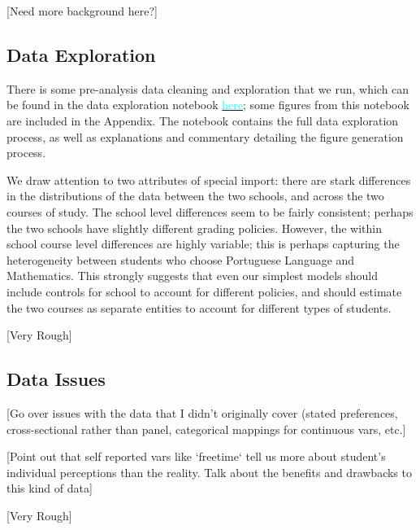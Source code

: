 \documentclass[12pt]{article}
\begin{document}
\textcolor{BrickRed}{[Need more background here?]}

\subsection{Data Exploration}
There is some pre-analysis data cleaning and exploration that we run, which can be found in the data exploration notebook \href{https://github.com/nadavtadelis/Reproducible_Metrics/blob/master/data_exploration.ipynb}{\textcolor{cyan}{here}}; some figures from this notebook are included in the Appendix. The notebook contains the full data exploration process, as well as explanations and commentary detailing the figure generation process.

We draw attention to two attributes of special import: there are stark differences in the distributions of the data between the two schools, and across the two courses of study. The school level differences seem to be fairly consistent; perhaps the two schools have slightly different grading policies. However, the within school course level differences are highly variable; this is perhaps capturing the heterogeneity between students who choose Portuguese Language and Mathematics. This strongly suggests that even our simplest models should include controls for school to account for different policies, and should estimate the two courses as separate entities to account for different types of students.

\textcolor{BrickRed}{[Very Rough]}

\subsection{Data Issues}

\textcolor{BrickRed}{[Go over issues with the data that I didn't originally cover (stated preferences, cross-sectional rather than panel, categorical mappings for continuous vars, etc.]}

\textcolor{BrickRed}{[Point out that self reported vars like `freetime` tell us more about student's individual perceptions than the reality. Talk about the benefits and drawbacks to this kind of data]}

\textcolor{BrickRed}{[Very Rough]}


\newpage
\end{document}
